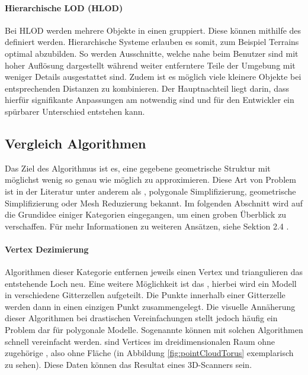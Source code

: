 \paragraph{Hierarchische LOD (HLOD)}
Bei HLOD werden mehrere Objekte in einen  gruppiert. Diese  können mithilfe des  definiert werden.
Hierarchische Systeme erlauben es somit, zum Beispiel Terrains optimal abzubilden. So werden Ausschnitte, welche nahe beim Benutzer sind mit hoher Auflösung dargestellt während weiter entferntere Teile der Umgebung mit weniger Details ausgestattet sind.
Zudem ist es möglich viele kleinere Objekte bei entsprechenden Distanzen zu kombinieren.
Der Hauptnachteil liegt darin, dass hierfür signifikante Anpassungen am  notwendig sind und für den Entwickler ein spürbarer Unterschied entstehen kann.

\subsection{Vergleich Algorithmen}
\label{chap:lodAlgorithmComparison}

Das Ziel des Algorithmus ist es, eine gegebene geometrische Struktur mit möglichst wenig  so genau wie möglich zu approximieren.
Diese Art von Problem ist in der Literatur unter anderem als , polygonale Simplifizierung, geometrische Simplifizierung oder Mesh Reduzierung bekannt.
Im folgenden Abschnitt wird auf die Grundidee einiger Kategorien eingegangen, um einen groben Überblick zu verschaffen.
Für mehr Informationen zu weiteren Ansätzen, siehe  Sektion 2.4 \cite{quadridBasedSurfaceSimplification}.

\paragraph{Vertex Dezimierung}
Algorithmen dieser Kategorie entfernen jeweils einen Vertex und triangulieren das entstehende Loch neu.
Eine weitere Möglichkeit ist das , hierbei wird ein Modell in verschiedene Gitterzellen aufgeteilt. Die Punkte innerhalb einer Gitterzelle werden dann in einen einzigen Punkt zusammengelegt. Die visuelle Annäherung dieser Algorithmen bei drastischen Vereinfachungen stellt jedoch häufig ein Problem dar für polygonale Modelle. Sogenannte  können mit solchen Algorithmen schnell vereinfacht werden.
 sind Vertices im dreidimensionalen Raum ohne zugehörige , also ohne Fläche (in Abbildung \ref{fig:pointCloudTorus} exemplarisch zu sehen). Diese Daten können das Resultat eines 3D-Scanners sein.

